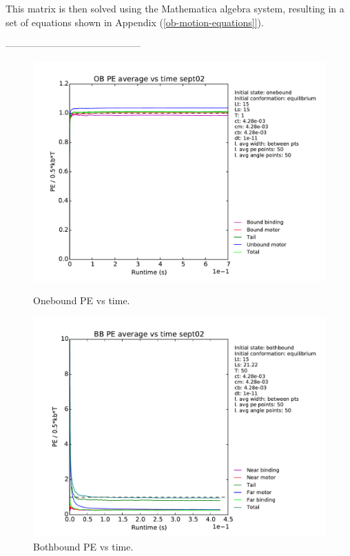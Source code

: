 \documentclass[10pt]{article} %
\begin{document}
This matrix is then solved using the Mathematica algebra system, resulting in a set of equations shown in Appendix (\ref{ob-motion-equations]}).

------------------------------------------

\begin{figure}[h!]
  \centering
  \begin{minipage}[b]{0.49\textwidth}
    \includegraphics[width=\textwidth]{../figures/OB_Average_PE.pdf}
    \caption{Onebound PE vs time.}
  \end{minipage}
  \begin{minipage}[b]{0.49\textwidth}
    \includegraphics[width=\textwidth]{../figures/BB_Average_PE.pdf}
    \caption{Bothbound PE vs time.}
  \end{minipage}
  \label{fig:equipartition_agreement}
\end{figure}
\end{document}
